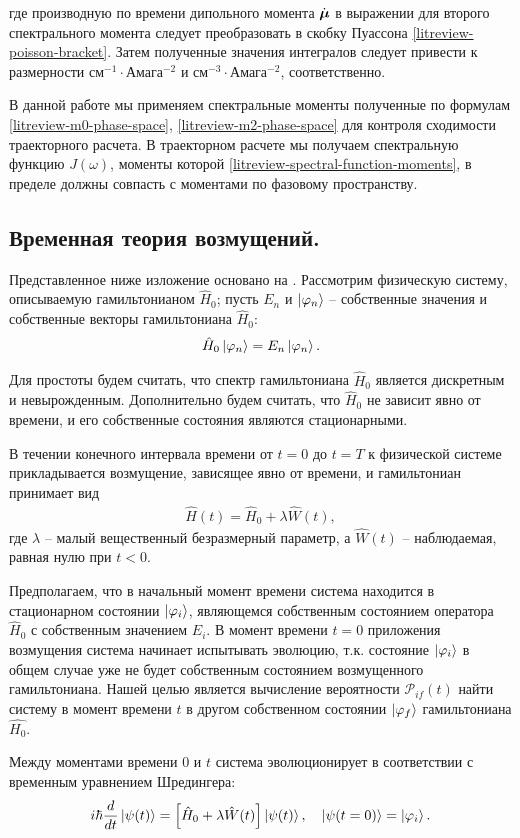 %
где производную по времени дипольного момента $\dot{\boldsymbol{\mu}}$ в выражении для второго спектрального момента следует преобразовать в скобку Пуассона \eqref{litreview-poisson-bracket}. Затем полученные значения интегралов следует привести к размерности см$^{-1} \cdot$Амага$^{-2}$ и  см$^{-3} \cdot$Амага$^{-2}$, соответственно. \par
В данной работе мы применяем спектральные моменты полученные по формулам \eqref{litreview-m0-phase-space}, \eqref{litreview-m2-phase-space} для контроля сходимости траекторного расчета. В траекторном расчете мы получаем спектральную функцию $J(\omega)$, моменты которой \eqref{litreview-spectral-function-moments}, в пределе должны совпасть с моментами по фазовому пространству.

\begin{subappendices}
\section{Временная теория возмущений.}

Представленное ниже изложение основано на \cite{cohentanuji}. Рассмотрим физическую систему, описываемую гамильтонианом $\hat{H}_0$; пусть $E_n$ и $\ket{\varphi_n}$ -- собственные значения и собственные векторы гамильтониана $\hat{H}_0$:
\begin{gather}
    \hat{H}_0 \ket{\varphi_n} = E_n \ket{\varphi_n}.
\end{gather}

Для простоты будем считать, что спектр гамильтониана $\hat{H}_0$ является дискретным и невырожденным. Дополнительно будем считать, что $\hat{H}_0$ не зависит явно от времени, и его собственные состояния являются стационарными. \par
В течении конечного интервала времени от $t = 0$ до $t = T$ к физической системе прикладывается возмущение, зависящее явно от времени, и гамильтониан принимает вид
\begin{gather}
    \hat{H}(t) = \hat{H}_0 + \lambda \hat{W}(t),
\end{gather}
где $\lambda$ -- малый вещественный безразмерный параметр, а $\hat{W}(t)$ -- наблюдаемая, равная нулю при $t < 0$. \par
Предполагаем, что в начальный момент времени система находится в стационарном состоянии $\ket{\varphi_i}$, являющемся собственным состоянием оператора $\hat{H}_0$ с собственным значением $E_i$. В момент времени $t = 0$ приложения возмущения система начинает испытывать эволюцию, т.к. состояние $\ket{\varphi_i}$ в общем случае уже не будет собственным состоянием возмущенного гамильтониана. Нашей целью является вычисление вероятности $\mathcal{P}_{if}(t)$ найти систему в момент времени $t$ в другом собственном состоянии $\ket{\varphi_f}$ гамильтониана $\hat{H_0}$. \par
Между моментами времени $0$ и $t$ система эволюционирует в соответствии с временным уравнением Шредингера:
\begin{gather}
    i \hbar \frac{d}{dt} \ket{\psi(t)} = \left[ \hat{H}_0 + \lambda \hat{W}(t) \right] \ket{\psi(t)}, \quad \ket{\psi(t = 0)} = \ket{\varphi_i}. \label{app-time-schroedinger}
\end{gather}


\end{subappendices}
